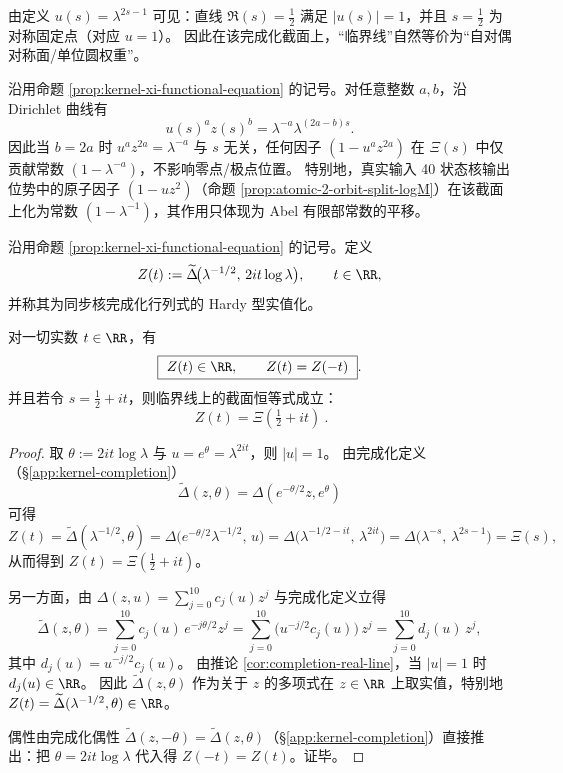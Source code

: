 \begin{remark}[临界线与对称固定点]\label{rem:kernel-critical-line-u1}
由定义 $u(s)=\lambda^{2s-1}$ 可见：直线 $\Re(s)=\tfrac12$ 满足 $|u(s)|=1$，并且 $s=\tfrac12$ 为对称固定点（对应 $u=1$）。
因此在该完成化截面上，“临界线”自然等价为“自对偶对称面/单位圆权重”。
\end{remark}

\begin{remark}\label{rem:dirichlet-balanced-atom-constant}
沿用命题 \ref{prop:kernel-xi-functional-equation} 的记号。对任意整数 \(a,b\)，沿 Dirichlet 曲线有
\[
u(s)^a z(s)^b=\lambda^{-a}\lambda^{(2a-b)s}.
\]
因此当 \(b=2a\) 时 \(u^a z^{2a}=\lambda^{-a}\) 与 \(s\) 无关，任何因子 \((1-u^a z^{2a})\) 在 \(\Xi(s)\) 中仅贡献常数 \((1-\lambda^{-a})\)，不影响零点/极点位置。
特别地，真实输入 40 状态核输出位势中的原子因子 \((1-uz^2)\)（命题 \ref{prop:atomic-2-orbit-split-logM}）在该截面上化为常数 \((1-\lambda^{-1})\)，其作用只体现为 Abel 有限部常数的平移。
\end{remark}

\begin{definition}\label{def:kernel-hardy-function}
沿用命题 \ref{prop:kernel-xi-functional-equation} 的记号。定义
$$
Z(t):=\widetilde{\Delta}\!\bigl(\lambda^{-1/2},\,2it\log\lambda\bigr),
\qquad t\in\RR,
$$
并称其为同步核完成化行列式的 Hardy 型实值化。
\end{definition}

\begin{proposition}\label{prop:kernel-hardy-real-even}
对一切实数 \(t\in\RR\)，有
$$
\boxed{\ Z(t)\in\RR,\qquad Z(t)=Z(-t)\ }.
$$
并且若令 \(s=\tfrac12+it\)，则临界线上的截面恒等式成立：
$$
\boxed{\ Z(t)=\Xi\!\left(\tfrac12+it\right)\ }.
$$
\end{proposition}
\begin{proof}
取 \(\theta:=2it\log\lambda\) 与 \(u=e^\theta=\lambda^{2it}\)，则 \(|u|=1\)。
由完成化定义（\S\ref{app:kernel-completion}）
\[
\widetilde{\Delta}(z,\theta)=\Delta(e^{-\theta/2}z,e^\theta)
\]
可得
\[
Z(t)=\widetilde{\Delta}(\lambda^{-1/2},\theta)
=\Delta\!\bigl(e^{-\theta/2}\lambda^{-1/2},\,u\bigr)
=\Delta\!\bigl(\lambda^{-1/2-it},\,\lambda^{2it}\bigr)
=\Delta\!\bigl(\lambda^{-s},\,\lambda^{2s-1}\bigr)
=\Xi(s),
\]
从而得到 \(Z(t)=\Xi(\tfrac12+it)\)。
\par
另一方面，由 \(\Delta(z,u)=\sum_{j=0}^{10}c_j(u)z^j\) 与完成化定义立得
\[
\widetilde{\Delta}(z,\theta)=\sum_{j=0}^{10}c_j(u)\,e^{-j\theta/2}z^j
=\sum_{j=0}^{10}\bigl(u^{-j/2}c_j(u)\bigr)\,z^j
=\sum_{j=0}^{10}d_j(u)\,z^j,
\]
其中 \(d_j(u)=u^{-j/2}c_j(u)\)。
由推论 \ref{cor:completion-real-line}，当 \(|u|=1\) 时 \(d_j(u)\in\RR\)。
因此 \(\widetilde{\Delta}(z,\theta)\) 作为关于 \(z\) 的多项式在 \(z\in\RR\) 上取实值，特别地 \(Z(t)=\widetilde{\Delta}(\lambda^{-1/2},\theta)\in\RR\)。
\par
偶性由完成化偶性 \(\widetilde{\Delta}(z,-\theta)=\widetilde{\Delta}(z,\theta)\)（\S\ref{app:kernel-completion}）直接推出：把 \(\theta=2it\log\lambda\) 代入得 \(Z(-t)=Z(t)\)。证毕。
\end{proof}

